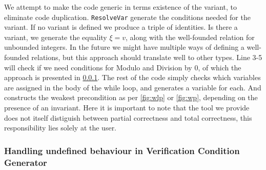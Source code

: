 We attempt to make the code generic in terms existence of the variant, to eliminate code duplication.
\texttt{ResolveVar} generate the conditions needed for the variant.
If no variant is defined we produce a triple of identities.
Is there a variant, we generate the equality $\xi = v$, along with the well-founded relation for unbounded integers.
In the future we might have multiple ways of defining a well-founded relations, but this approach should translate well to other types.
Line 3-5 will check if we need conditions for Modulo and Division by 0, of which the approach is presented in \cref{sec:undef}. The rest of the code simply checks which variables are assigned in the body of the while loop, and generates a variable for each. And constructs the weakest precondition as per \cref{fig:wlp} or \cref{fig:wp}, depending on the presence of an invariant. Here it is important to note that the tool we provide does not itself distiguish between partial correctness and total correctness, this responsibility lies solely at the user.

\subsubsection{Handling undefined behaviour in Verification Condition Generator}\label{sec:undef}
